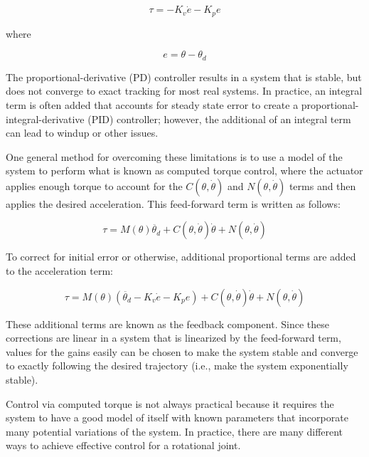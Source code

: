 \begin{equation}
\tau = -K_{v} \dot{e} - K_{p} e
\end{equation}

where

\begin{equation}
e = \theta - \theta_{d}
\end{equation}

The proportional-derivative (PD) controller results in a system that is stable, but does not converge to
exact tracking for most real systems. In practice, an integral term is often added that accounts for steady state error to create a proportional-integral-derivative (PID) controller; however, the additional of an integral term can lead to windup or other issues.

One general method for overcoming these limitations is to use a model of the 
system to perform what is known as computed torque control, where the actuator
applies enough torque to account for the $C(\theta, \dot{\theta})$ and
$N(\theta, \dot{\theta})$ terms and then applies the desired acceleration. This feed-forward term is written as follows:

\begin{equation}
\tau = M(\theta) \ddot{\theta_{d}} + C(\theta, \dot{\theta}) \dot{\theta} + N(\theta, \dot{\theta})
\end{equation}

To correct for initial error or otherwise, additional proportional terms are
added to the acceleration term:

\begin{equation}
\tau = M(\theta) (\ddot{\theta_{d}} - K_{v} \dot{e} - K_{p} e) + C(\theta, \dot{\theta}) \dot{\theta} + N(\theta, \dot{\theta})
\end{equation}

These additional terms are known as the feedback component. Since these 
corrections are linear in a system that is linearized by the feed-forward term,
values for the gains easily can be chosen to make the system stable and converge
to exactly following the desired trajectory (i.e., make the system exponentially stable). \cite{MLS94}

Control via computed torque 
is not always practical because it requires the system to have a good model of 
itself with known parameters that incorporate many potential variations of the
system. In practice, 
there are many different ways to achieve effective control for a rotational 
joint.


